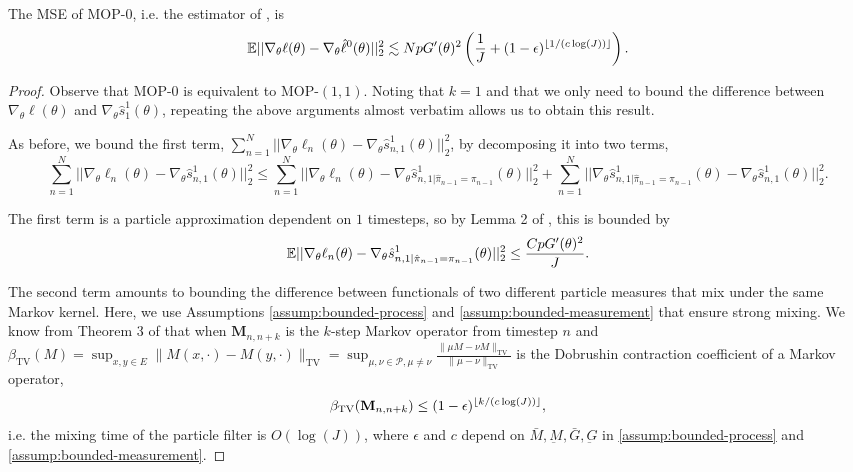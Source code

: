 \begin{cor}
    The MSE of MOP-$0$, i.e. the estimator of \cite{naesseth18}, is
    \begin{equation}
        \mathbb{E}||\nabla_\theta\ell(\theta) - \nabla_\theta \hat\ell^0(\theta)||_2^2 \lesssim NpG'(\theta)^2\left(\frac{1}{J}+(1-\epsilon)^{\lfloor 1/(c\log(J)) \rfloor}\right).
    \end{equation}
\end{cor}
\begin{proof}
    Observe that MOP-$0$ is equivalent to MOP-$(1,1)$. Noting that $k=1$ and that we only need to bound the difference between $\nabla_\theta \ell(\theta)$ and $\nabla_\theta \hat s_1^1(\theta)$, repeating the above arguments almost verbatim allows us to obtain this result. 

    
As before, we bound the first term, $\sum_{n=1}^N||\nabla_\theta\ell_n(\theta) - \nabla_\theta\hat s_{n,1}^1(\theta)||_2^2$, by decomposing it into two terms, 
$$\sum_{n=1}^N||\nabla_\theta\ell_n(\theta) - \nabla_\theta\hat s_{n,1}^1(\theta)||_2^2 \leq \sum_{n=1}^N ||\nabla_\theta\ell_n(\theta) - \nabla_\theta\hat s_{n,1|\hat\pi_{n-1}=\pi_{n-1}}^1(\theta)||_2^2 + \sum_{n=1}^N ||\nabla_\theta\hat s_{n,1|\hat\pi_{n-1}=\pi_{n-1}}^1(\theta) - \nabla_\theta\hat s_{n,1}^1(\theta)||_2^2.$$

The first term is a particle approximation dependent on $1$ timesteps, so by Lemma 2 of \cite{karjalainen23}, this is bounded by
$$\mathbb{E}||\nabla_\theta\ell_n(\theta) - \nabla_\theta\hat s_{n,1|\hat\pi_{n-1}=\pi_{n-1}}^1(\theta)||_2^2 \leq \frac{CpG'(\theta)^2}{J}.$$

The second term amounts to bounding the difference between functionals of two different particle measures that mix under the same Markov kernel. Here, we use Assumptions \ref{assump:bounded-process} and \ref{assump:bounded-measurement} that ensure strong mixing. We know from Theorem 3 of \cite{karjalainen23} that when $\textbf{M}_{n,n+k}$ is the $k$-step Markov operator from timestep $n$ and $\beta_{\text{TV}}(M) = \sup _{x, y \in E}\|M(x, \cdot)-M(y, \cdot)\|_{\mathrm{TV}}=\sup _{\mu, \nu \in \mathcal{P}, \mu \neq \nu} \frac{\|\mu M-\nu M\|_{\mathrm{TV}}}{\|\mu-\nu\|_{\mathrm{TV}}}$ is the Dobrushin contraction coefficient of a Markov operator, 
$$\beta_{\text{TV}}(\textbf{M}_{n,n+k}) \leq (1-\epsilon)^{\lfloor k/(c\log(J)) \rfloor},$$
i.e. the mixing time of the particle filter is $O(\log(J))$, where $\epsilon$ and $c$ depend on $\bar{M}, \underbar{M}, \bar{G}, \underbar{G}$ in \ref{assump:bounded-process} and \ref{assump:bounded-measurement}. 


\end{proof}
